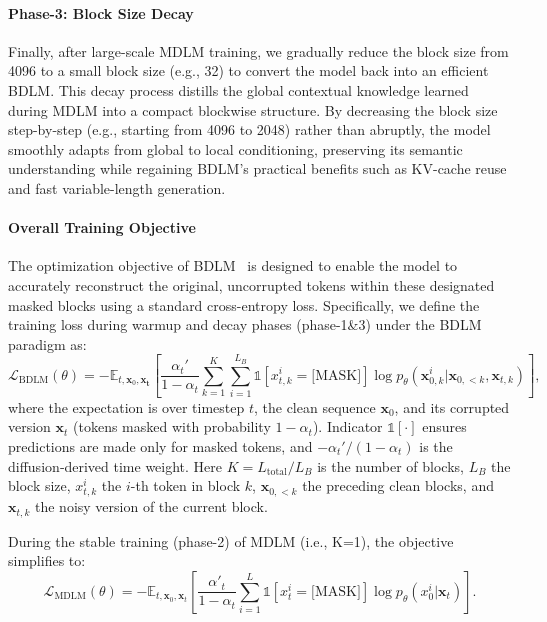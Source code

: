 \paragraph{Phase-3: Block Size Decay} Finally, after large-scale MDLM training, we gradually reduce the block size from 4096 to a small block size (e.g., 32) to convert the model back into an efficient BDLM. This decay process distills the global contextual knowledge learned during MDLM into a compact blockwise structure. By decreasing the block size step-by-step (e.g., starting from 4096 to 2048) rather than abruptly, the model smoothly adapts from global to local conditioning, preserving its semantic understanding while regaining BDLM’s practical benefits such as KV-cache reuse and fast variable-length generation.

\paragraph{Overall Training Objective} The optimization objective of BDLM~\citep{Blockdiffusion2025}  is designed to enable the model to accurately reconstruct the original, uncorrupted tokens within these designated masked blocks using a standard cross-entropy loss. Specifically, we define the training loss during  warmup and decay phases (phase-1\&3) under the BDLM paradigm as:
\begin{equation}\label{eq:bdlm}
    \mathcal{L}_{\text{BDLM}}(\theta) = - \mathbb{E}_{t, \bm{x}_0, \bm{x_t}} \left[ \frac{\alpha_{t}'}{1-\alpha_{t}}\sum_{k=1}^{K} \sum_{i=1}^{L_B} \mathbb{1}[x_{t,k}^i=\text{[MASK]}] \log p_{\theta}(\bm{x}_{0,k}^i | \bm{x}_{0,<k}, \bm{x}_{t,k}) \right],
\end{equation}
where the expectation is over timestep \(t\), the clean sequence \(\bm{x}_0\), and its corrupted version \(\bm{x}_t\) (tokens masked with probability \(1-\alpha_t\)). Indicator $\mathbb{1}[\cdot]$ ensures predictions are made only for masked tokens, and \(-\alpha_t'/(1-\alpha_t)\) is the diffusion‑derived time weight. Here \(K=L_{\text{total}}/L_B\) is the number of blocks, \(L_B\) the block size, \(x_{t,k}^i\) the \(i\)-th token in block \(k\), \(\bm{x}_{0,<k}\) the preceding clean blocks, and \(\bm{x}_{t,k}\) the noisy version of the current block.

During the stable training (phase-2) of MDLM (i.e., K=1), the objective simplifies to:
\begin{equation}\label{eq:mdlm}
    \mathcal{L}_{\text{MDLM}}(\theta) = - \mathbb{E}_{t,\bm{x}_0,\bm{x}_t} [\frac{\alpha'_t}{1-\alpha_t}\sum_{i=1}^{L}\mathbb{1}[x_t^i=\text{[MASK]}]\log p_{\theta}(x^i_0 | \bm{x}_{t})].
\end{equation}

